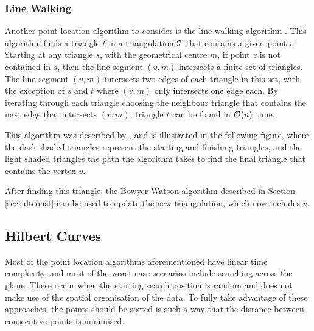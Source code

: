 \subsubsection*{Line Walking}
Another point location algorithm to consider is the line walking algorithm \cite{walking}. This algorithm finds a triangle $t$ in a triangulation $\mathcal{T}$ that contains a given point $v$. 
Starting at any triangle $s$, with the geometrical centre $m$, if point $v$ is not contained in $s$, then the line segment $(v,m)$ intersects a finite set of triangles.  
The line segment $(v,m)$ intersects two edges of each triangle in this set, with the exception of $s$ and $t$ where $(v,m)$ only intersects one edge each. 
By iterating through each triangle choosing the neighbour triangle that contains the next edge that intersects $(v,m)$, triangle $t$ can be found in $\mathcal{O}(n)$ time.


This algorithm was described by \citet{walking}, and is illustrated in the following figure, where the dark shaded triangles represent the starting and finishing triangles, and the light shaded triangles the path the algorithm takes to find the final triangle that contains the vertex $v$.

After finding this triangle, the Bowyer-Watson algorithm described in Section \ref{sect:dtconst} can be used to update the new triangulation, which now includes $v$.

\subsection{Hilbert Curves}
Most of the point location algorithms aforementioned have linear time complexity, and most of the worst case scenarios include searching across the plane. These occur when the starting search position is random and does not make use of the spatial organisation of the data. To fully take advantage of these approaches, the points should be sorted is such a way that the distance between consecutive points is minimised.


